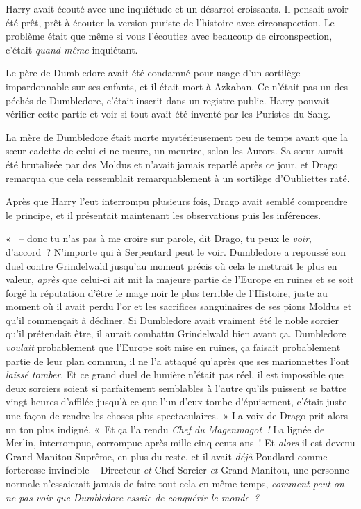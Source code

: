 \later

Harry avait écouté avec une inquiétude et un désarroi croissants.
Il pensait avoir été prêt, prêt à écouter la version puriste de l'histoire avec circonspection.
Le problème était que même si vous l'écoutiez avec beaucoup de circonspection, c'était \emph{quand même} inquiétant.

Le père de Dumbledore avait été condamné pour usage d'un sortilège impardonnable sur ses enfants, et il était mort à Azkaban.
Ce n'était pas un des péchés de Dumbledore, c'était inscrit dans un registre public.
Harry pouvait vérifier cette partie et voir si tout avait été inventé par les Puristes du Sang.

La mère de Dumbledore était morte mystérieusement peu de temps avant que la sœur cadette de celui-ci ne meure, un meurtre, selon les Aurors.
Sa sœur aurait été brutalisée par des Moldus et n'avait jamais reparlé après ce jour, et Drago remarqua que cela ressemblait remarquablement à un sortilège d'Oubliettes raté.

Après que Harry l'eut interrompu plusieurs fois, Drago avait semblé comprendre le principe, et il présentait maintenant les observations puis les inférences.

«~ -- donc tu n'as pas à me croire sur parole, dit Drago, tu peux le \emph{voir}, d'accord~?
N'importe qui à Serpentard peut le voir.
Dumbledore a repoussé son duel contre Grindelwald jusqu'au moment précis où cela le mettrait le plus en valeur, \emph{après} que celui-ci ait mit la majeure partie de l'Europe en ruines et se soit forgé la réputation d'être le mage noir le plus terrible de l'Histoire, juste au moment où il avait perdu l'or et les sacrifices sanguinaires de ses pions Moldus et qu'il commençait à décliner.
Si Dumbledore avait vraiment été le noble sorcier qu'il prétendait être, il aurait combattu Grindelwald bien avant ça.
Dumbledore \emph{voulait} probablement que l'Europe soit mise en ruines, ça faisait probablement partie de leur plan commun, il ne l'a attaqué qu'après que ses marionnettes l'ont \emph{laissé tomber}.
Et ce grand duel de lumière n'était pas réel, il est impossible que deux sorciers soient si parfaitement semblables à l'autre qu'ils puissent se battre vingt heures d'affilée jusqu'à ce que l'un d'eux tombe d'épuisement, c'était juste une façon de rendre les choses plus spectaculaires.~»
La voix de Drago prit alors un ton plus indigné.
«~Et ça l'a rendu \emph{Chef du Magenmagot~!} La lignée de Merlin, interrompue, corrompue après mille-cinq-cents ans~!
Et \emph{alors} il est devenu Grand Manitou Suprême, en plus du reste, et il avait \emph{déjà} Poudlard comme forteresse invincible -- Directeur \emph{et} Chef Sorcier \emph{et} Grand Manitou, une personne normale n'essaierait jamais de faire tout cela en même temps, \emph{comment peut-on ne pas voir que Dumbledore essaie de conquérir le monde~?}


